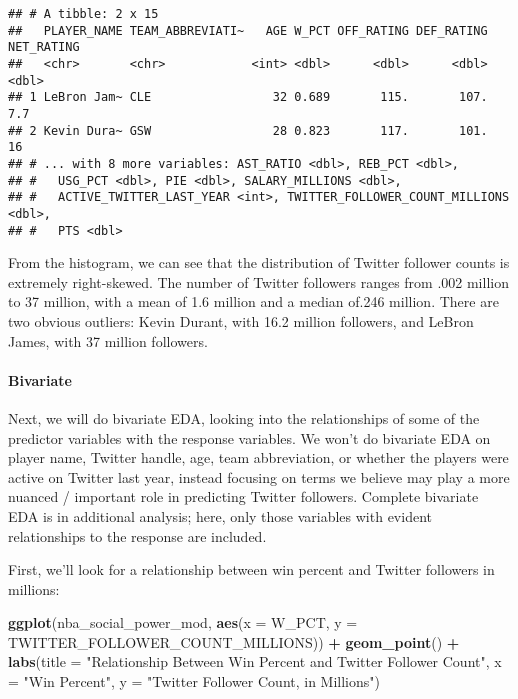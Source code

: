 \documentclass[]{article}
\newenvironment{Shaded}{\begin{snugshade}}{\end{snugshade}}
\newcommand{\DataTypeTok}[1]{\textcolor[rgb]{0.13,0.29,0.53}{#1}}
\newcommand{\KeywordTok}[1]{\textcolor[rgb]{0.13,0.29,0.53}{\textbf{#1}}}
\newcommand{\NormalTok}[1]{#1}
\newcommand{\OperatorTok}[1]{\textcolor[rgb]{0.81,0.36,0.00}{\textbf{#1}}}
\newcommand{\StringTok}[1]{\textcolor[rgb]{0.31,0.60,0.02}{#1}}
\let\oldparagraph\paragraph
\renewcommand{\paragraph}[1]{\oldparagraph{#1}\mbox{}}
\begin{document}
\begin{verbatim}
## # A tibble: 2 x 15
##   PLAYER_NAME TEAM_ABBREVIATI~   AGE W_PCT OFF_RATING DEF_RATING NET_RATING
##   <chr>       <chr>            <int> <dbl>      <dbl>      <dbl>      <dbl>
## 1 LeBron Jam~ CLE                 32 0.689       115.       107.        7.7
## 2 Kevin Dura~ GSW                 28 0.823       117.       101.       16  
## # ... with 8 more variables: AST_RATIO <dbl>, REB_PCT <dbl>,
## #   USG_PCT <dbl>, PIE <dbl>, SALARY_MILLIONS <dbl>,
## #   ACTIVE_TWITTER_LAST_YEAR <int>, TWITTER_FOLLOWER_COUNT_MILLIONS <dbl>,
## #   PTS <dbl>
\end{verbatim}

From the histogram, we can see that the distribution of Twitter follower
counts is extremely right-skewed. The number of Twitter followers ranges
from .002 million to 37 million, with a mean of 1.6 million and a median
of.246 million. There are two obvious outliers: Kevin Durant, with 16.2
million followers, and LeBron James, with 37 million followers.

\hypertarget{bivariate}{%
\paragraph{Bivariate}\label{bivariate}}

Next, we will do bivariate EDA, looking into the relationships of some
of the predictor variables with the response variables. We won't do
bivariate EDA on player name, Twitter handle, age, team abbreviation, or
whether the players were active on Twitter last year, instead focusing
on terms we believe may play a more nuanced / important role in
predicting Twitter followers. Complete bivariate EDA is in additional
analysis; here, only those variables with evident relationships to the
response are included.

First, we'll look for a relationship between win percent and Twitter
followers in millions:

\begin{Shaded}
\begin{Highlighting}[]
\KeywordTok{ggplot}\NormalTok{(nba_social_power_mod, }\KeywordTok{aes}\NormalTok{(}\DataTypeTok{x =}\NormalTok{ W_PCT, }\DataTypeTok{y =}\NormalTok{ TWITTER_FOLLOWER_COUNT_MILLIONS)) }\OperatorTok{+}\StringTok{ }
\StringTok{  }\KeywordTok{geom_point}\NormalTok{() }\OperatorTok{+}\StringTok{ }
\StringTok{  }\KeywordTok{labs}\NormalTok{(}\DataTypeTok{title =} \StringTok{"Relationship Between Win Percent and Twitter Follower Count"}\NormalTok{, }
       \DataTypeTok{x =} \StringTok{"Win Percent"}\NormalTok{, }\DataTypeTok{y =} \StringTok{"Twitter Follower Count, in Millions"}\NormalTok{)}
\end{Highlighting}
\end{Shaded}
\end{document}
